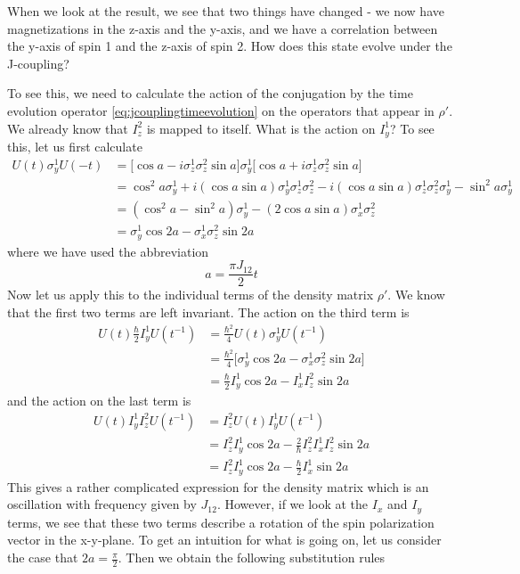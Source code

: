 \documentclass[a4paper, draft]{article}
\theoremstyle{own}
\theoremstyle{remark}
\begin{document}
When we look at the result, we see that two things have changed - we now have magnetizations in the z-axis and the y-axis, and we have a correlation between the y-axis of spin 1 and the z-axis of spin 2. How does this state evolve under the J-coupling?

To see this, we need to calculate the action of the conjugation by the time evolution operator \eqref{eq:jcouplingtimeevolution} on the operators that appear in $\rho'$. We already know that $I_z^2$ is mapped to itself. What is the action on $I_y^1$? To see this, let us first calculate
\begin{align*}
U(t) \sigma_y^1 U(-t) &= \big[   \cos a -i \sigma_z^1 \sigma_z^2 \sin a \big] 
\sigma_y^1  
\big[ \cos a +i \sigma_z^1 \sigma_z^2 \sin a \big] \\
&= \cos^2 a \sigma_y^1 
+ 
i (\cos a \sin a) \sigma_y^1 \sigma_z^1 \sigma_z^2
-i (\cos a \sin a) \sigma_z^1 \sigma_z^2 \sigma_y^1 
- \sin^2 a \sigma_y^1 \\
&= (\cos^2 a - \sin^2 a) \sigma_y^1 - (2  \cos a \sin a) \sigma_x^1 \sigma_z^2 \\
&= \sigma_y^1 \cos 2a - \sigma_x^1 \sigma_z^2 \sin 2a
\end{align*}
where we have used the abbreviation
$$
a = \frac{\pi J_{12}}{2} t
$$
Now let us apply this to the individual terms of the density matrix $\rho'$. We know that the first two terms are left invariant. The action on the third term is
\begin{align*}
U(t) \frac{\hbar}{2} I_y^1 U(t^{-1}) &= \frac{\hbar^2}{4} U(t) \sigma_y^1 U(t^{-1}) \\
&= \frac{\hbar^2}{4} 
\big[ 
\sigma_y^1 \cos 2a - \sigma_x^1 \sigma_z^2 \sin 2a
\big] \\
&= \frac{\hbar}{2} I_y^1 \cos 2a - I_x^1 I_z^2 \sin 2a
\end{align*}
and the action on the last term is
\begin{align*}
U(t)  I_y^1  I_z^2 U(t^{-1}) &=
I_z^2 U(t) I_y^1 U(t^{-1}) \\
&= I_z^2 I_y^1 \cos 2a - \frac{2}{\hbar} I_z^2 I_x^1 I_z^2 \sin 2a  \\
&= I_z^2 I_y^1 \cos 2a - \frac{\hbar}{2} I_x^1 \sin 2a
\end{align*}
This gives a rather complicated expression for the density matrix which is an oscillation with frequency given by $J_{12}$. However, if we look at the $I_x$ and $I_y$ terms, we see that these two terms describe a rotation of the spin polarization vector in the x-y-plane. To get an intuition for what is going on, let us consider the case that $2a = \frac{\pi}{2}$. Then we obtain the following substitution rules
\end{document}
